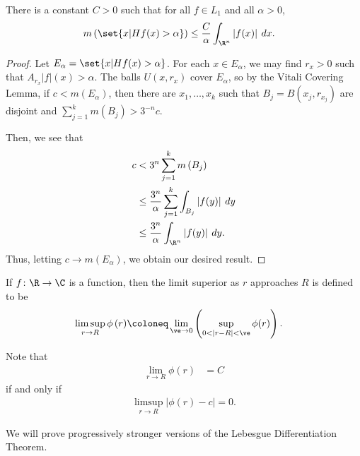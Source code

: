 \documentclass[10pt]{mypackage}
\begin{document}
\begin{theorem}
  There is a constant $C > 0$ such that for all $f\in L_1$ and all $\alpha > 0$,
  \begin{align*}
    m\left( \set{x | Hf(x) > \alpha} \right) &\leq \frac{C}{\alpha} \int_{\R^n}^{} \left\vert f(x) \right\vert\:dx.
  \end{align*}
\end{theorem}
\begin{proof}
  Let $E_{\alpha} = \set{x | Hf(x) > \alpha}$. For each $x\in E_{\alpha}$, we may find $r_x > 0$ such that $A_{r_x}\left\vert f \right\vert(x) > \alpha$. The balls $U\left( x,r_x \right)$ cover $E_{\alpha}$, so by the Vitali Covering Lemma, if $c < m\left( E_{\alpha} \right)$, then there are $x_1,\dots,x_k$ such that $B_j = B\left( x_j,r_{x_j} \right)$ are disjoint and $\sum_{j=1}^{k}m\left( B_j \right) > 3^{-n}c$.\newline

  Then, we see that
  \begin{align*}
    c &< 3^{n}\sum_{j=1}^{k} m\left( B_j \right)\\
      &\leq \frac{3^{n}}{\alpha} \sum_{j=1}^{k} \int_{B_j}^{} \left\vert f(y) \right\vert\:dy\\
      &\leq \frac{3^{n}}{\alpha} \int_{\R^{n}}^{} \left\vert f(y) \right\vert\:dy.
  \end{align*}
  Thus, letting $c \rightarrow m\left( E_{\alpha} \right)$, we obtain our desired result.
\end{proof}
\begin{definition}
  If $f\colon \R\rightarrow \C$ is a function, then the limit superior as $r$ approaches $R$ is defined to be
  \begin{align*}
    \limsup_{r\rightarrow R} \phi\left( r \right) &\coloneq \lim_{\ve\rightarrow 0} \left( \sup_{0 < \left\vert r-R \right\vert < \ve} \phi(r) \right).
  \end{align*}
\end{definition}
\begin{remark}
  Note that
  \begin{align*}
    \lim_{r\rightarrow R} \phi(r) &= C
  \end{align*}
  if and only if
  \begin{align*}
    \limsup_{r\rightarrow R} \left\vert \phi(r) - c \right\vert = 0.
  \end{align*}
\end{remark}
We will prove progressively stronger versions of the Lebesgue Differentiation Theorem.
\end{document}
